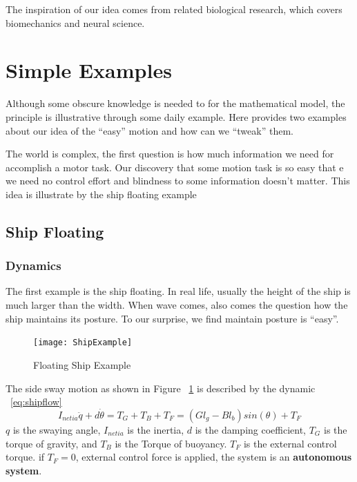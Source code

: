 The inspiration of our idea comes from related biological research, which covers biomechanics and neural science.

\section{Simple Examples}

Although some obscure knowledge is needed to for the mathematical model, the principle is illustrative through some daily example. 
Here provides two examples about our idea of the “easy” motion and how can we “tweak” them.

The world is complex, the first question is how much information we need for accomplish a motor task. 
Our discovery that some motion task is so easy that e we need no control effort and blindness to some information doesn’t matter.
This idea is illustrate by the ship floating example

\subsection{Ship Floating}


\subsubsection*{Dynamics}
The first example is the ship floating. 
In real life, usually the height of the ship is much larger than the width. 
When wave comes, also comes the question how the ship maintains its posture.
To our surprise, we find maintain posture is “easy”.



\begin{figure}[!htbp]
  \begin{center}
    \texttt{[image: ShipExample]}
    \caption{Floating Ship Example}
    \label{fig:ShipFloating}
  \end{center}
\end{figure}



The side sway motion as shown in Figure ~\ref{fig:ShipFloating} is described by the dynamic ~\ref{eq:shipflow}
\begin{equation}
I_{netia}\ddot{q}+d\dot{\theta}=T_{G}+T_{B}+T_{F}=(Gl_{g}-Bl_{b})sin(\theta)+T_{F}
\label{eq:shipflow}
\end{equation}
$q$ is the swaying angle,
$I_{netia}$ is the inertia,  
$d$ is the damping coefficient,
$T_{G}$ is the torque of gravity, and $T_{B}$ is the Torque of buoyancy.
$T_{F}$ is the external control torque.
if $T_{F}=0$, external control force is applied, the system is an \textbf{autonomous system}.





